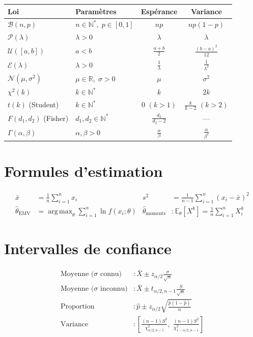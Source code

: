 \documentclass[12pt,a4paper,twoside]{book}
\theoremstyle{definition}
\theoremstyle{plain}
\theoremstyle{remark}
\newcommand{\E}{\mathbb{E}}
\newcommand{\R}{\mathbb{R}}
\newcommand{\N}{\mathbb{N}}
\newcommand{\phat}{\hat{p}}
\newcommand{\thetahat}{\hat{\theta}}
\DeclareMathOperator*{\argmax}{arg\,max}
\begin{document}
\begin{center}
\begin{tabular}{llcc}
\toprule
\textbf{Loi} & \textbf{Param\`etres} & \textbf{Esp\'erance} & \textbf{Variance} \\
\midrule
$\mathcal{B}(n,p)$ & $n\in\N^*,\; p\in[0,1]$ & $np$ & $np(1-p)$ \\
$\mathcal{P}(\lambda)$ & $\lambda>0$ & $\lambda$ & $\lambda$ \\
$\mathcal{U}([a,b])$ & $a<b$ & $\frac{a+b}{2}$ & $\frac{(b-a)^2}{12}$ \\
$\mathcal{E}(\lambda)$ & $\lambda>0$ & $\frac{1}{\lambda}$ & $\frac{1}{\lambda^2}$ \\
$\mathcal{N}(\mu,\sigma^2)$ & $\mu\in\R,\;\sigma>0$ & $\mu$ & $\sigma^2$ \\
$\chi^2(k)$ & $k\in\N^*$ & $k$ & $2k$ \\
$t(k)$ (Student) & $k\in\N^*$ & $0$ $(k>1)$ & $\frac{k}{k-2}$ $(k>2)$ \\
$F(d_1,d_2)$ (Fisher) & $d_1,d_2\in\N^*$ & $\frac{d_2}{d_2-2}$ & --- \\
$\Gamma(\alpha,\beta)$ & $\alpha,\beta>0$ & $\frac{\alpha}{\beta}$ & $\frac{\alpha}{\beta^2}$ \\
\bottomrule
\end{tabular}
\end{center}

\section{Formules d'estimation}

\begin{align}
\bar{x} &= \frac{1}{n}\sum_{i=1}^n x_i &
s^2 &= \frac{1}{n-1}\sum_{i=1}^n (x_i-\bar{x})^2 \\
\thetahat_{\text{EMV}} &= \argmax_\theta \sum_{i=1}^n \ln f(x_i;\theta) &
\thetahat_{\text{moments}} &: \E_\theta[X^k] = \frac{1}{n}\sum_{i=1}^n X_i^k
\end{align}

\section{Intervalles de confiance}

\begin{align}
\text{Moyenne (}\sigma\text{ connu)} &: \bar{X} \pm z_{\alpha/2}\frac{\sigma}{\sqrt{n}} \\
\text{Moyenne (}\sigma\text{ inconnu)} &: \bar{X} \pm t_{\alpha/2,n-1}\frac{S}{\sqrt{n}} \\
\text{Proportion} &: \phat \pm z_{\alpha/2}\sqrt{\frac{\phat(1-\phat)}{n}} \\
\text{Variance} &: \left[\frac{(n-1)S^2}{\chi^2_{\alpha/2,n-1}},\;\frac{(n-1)S^2}{\chi^2_{1-\alpha/2,n-1}}\right]
\end{align}
\end{document}
